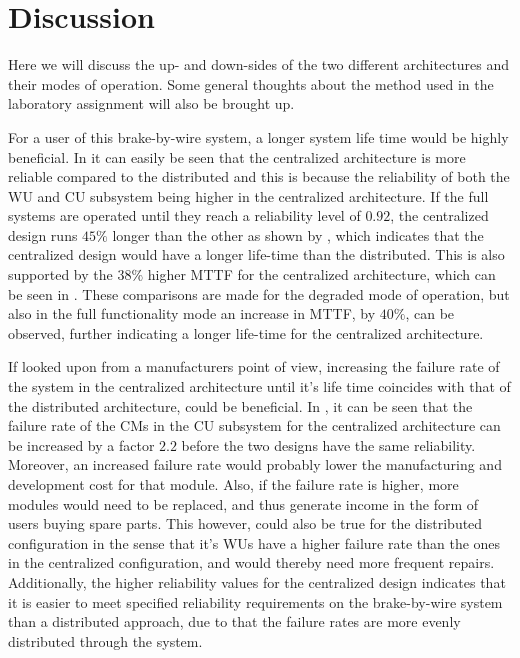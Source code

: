 \newpage
\section{Discussion}
\label{S5}
Here we will discuss the up- and down-sides of the two different architectures and their modes of operation. Some general thoughts about the method used in the laboratory assignment will also be brought up.

For a user of this brake-by-wire system, a longer system life time would be highly beneficial. In  it can easily be seen that the centralized architecture is more reliable compared to the distributed and this is because the reliability of both the WU and CU subsystem being higher in the centralized architecture. If the full systems are operated until they reach a reliability level of $0.92$, the centralized design runs $45\%$ longer than the other as shown by , which indicates that the centralized design would have a longer life-time than the distributed. This is also supported by the $38\%$ higher MTTF for the centralized architecture, which can be seen in . These comparisons are made for the degraded mode of operation, but also in the full functionality mode an increase in MTTF, by $40\%$, can be observed, further indicating a longer life-time for the centralized architecture. 

If looked upon from a manufacturers point of view, increasing the failure rate of the system in the centralized architecture until it's life time coincides with that of the distributed architecture, could be beneficial. In , it can be seen that the failure rate of the CMs in the CU subsystem for the centralized architecture can be increased by a factor $2.2$ before the two designs have the same reliability. Moreover, an increased failure rate would probably lower the manufacturing and development cost for that module. Also, if the failure rate is higher, more modules would need to be replaced, and thus generate income in the form of users buying spare parts. This however, could also be true for the distributed configuration in the sense that it's WUs have a higher failure rate than the ones in the centralized configuration, and would thereby need more frequent repairs. Additionally, the higher reliability values for the centralized design indicates that it is easier to meet specified reliability requirements on the brake-by-wire system than a distributed approach, due to that the failure rates are more evenly distributed through the system. 

